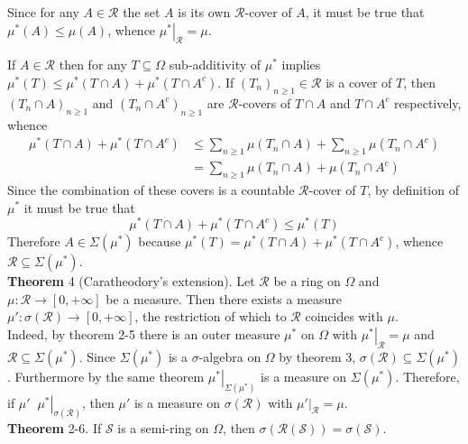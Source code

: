 \documentclass[a4paper]{article}
\newcommand{\clo}[1]{\left [ #1 \right ]}
\newcommand{\brac}[1]{\left ( #1 \right )}
\newcommand{\induc}[1]{\left . #1 \right \vert}
\newcommand{\Zinf}{\clo{ 0, +\infty }}
\newcommand{\Scal}{\mathcal{S}}
\newcommand{\Ring}[1]{\mathcal{R}\brac{#1}}
\newcommand{\defn}{\mathop{\overset{\Delta}{=}}\nolimits}
\begin{document}
Since for any $A\in \mathcal{R}$ the set $A$ is its own $\mathcal{R}$-cover of $A$, it must be true that $\mu^\ast\brac{A}\leq \mu\brac{A}$, whence $\induc{\mu^\ast}_{\mathcal{R}} = \mu$.

If $A\in \mathcal{R}$ then for any $T\subseteq\Omega$ sub-additivity of $\mu^\ast$ implies $\mu^\ast\brac{T}\leq \mu^\ast\brac{T\cap A}+\mu^\ast\brac{T\cap A^c}$. If $\brac{T_n}_{n\geq1}\in \mathcal{R}$ is a cover of $T$, then $\brac{T_n\cap A}_{n\geq1}$ and $\brac{T_n\cap A^c}_{n\geq1}$ are $\mathcal{R}$-covers of $T\cap A$ and $T\cap A^c$ respectively, whence \begin{align*}\mu^\ast\brac{T\cap A}+\mu^\ast\brac{T\cap A^c}&\leq \sum_{n\geq1}\mu\brac{T_n\cap A}+\sum_{n\geq1}\mu\brac{T_n\cap A^c}\\&= \sum_{n\geq1}\mu\brac{T_n\cap A}+\mu\brac{T_n\cap A^c}\end{align*} Since the combination of these covers is a countable $\mathcal{R}$-cover of $T$, by definition of $\mu^\ast$ it must be true that \[\mu^\ast\brac{T\cap A}+\mu^\ast\brac{T\cap A^c}\leq \mu^\ast\brac{T}\] Therefore $A\in \Sigma\brac{\mu^\ast}$ because $\mu^\ast\brac{T}=\mu^\ast\brac{T\cap A}+\mu^\ast\brac{T\cap A^c}$, whence $\mathcal{R}\subseteq\Sigma\brac{\mu^\ast}$.\\

\label{thm:caratheodory1} \noindent \textbf{Theorem} 4 (Caratheodory's extension).
Let $\mathcal{R}$ be a ring on $\Omega$ and $\mu:\mathcal{R}\to \Zinf$ be a measure. Then there exists a measure $\mu':\sigma\brac{\mathcal{R}}\to \Zinf$, the restriction of which to $\mathcal{R}$ coincides with $\mu$.\\

Indeed, by theorem 2-5 there is an outer measure $\mu^\ast$ on $\Omega$ with $\induc{\mu^\ast}_\mathcal{R}=\mu$ and $\mathcal{R}\subseteq\Sigma\brac{\mu^\ast}$. Since $\Sigma\brac{\mu^\ast}$ is a $\sigma$-algebra on $\Omega$ by theorem 3, $\sigma\brac{\mathcal{R}}\subseteq \Sigma\brac{\mu^\ast}$. Furthermore by the same theorem $\induc{\mu^\ast}_{\Sigma\brac{\mu^\ast}}$ is a measure on $\Sigma\brac{\mu^\ast}$. Therefore, if $\mu'\defn \induc{\mu^\ast}_{\sigma\brac{\mathcal{R}}}$, then $\mu'$ is a measure on $\sigma\brac{\mathcal{R}}$ with $\induc{\mu'}_\mathcal{R} = \mu$.\\

\label{thm:ring_semi_ring_sigma_algebra} \noindent \textbf{Theorem} 2-6.
If $\Scal$ is a semi-ring on $\Omega$, then $\sigma\brac{\Ring{\Scal}}=\sigma\brac{\Scal}$.
\end{document}

